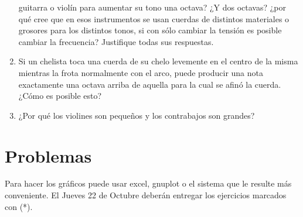 \documentclass[a4paper,12pt]{article}
\begin{document}
\begin{enumerate}
		guitarra o violín para aumentar su tono una octava? ¿Y dos octavas?
		¿por qué cree que en esos instrumentos se usan cuerdas de distintos
		materiales o grosores para los distintos tonos, si con sólo cambiar la
		tensión es posible cambiar la frecuencia? Justifique todas sus
		respuestas.
	\item Si un chelista toca una cuerda de su chelo levemente en el centro de
		la misma mientras la frota normalmente con el arco, puede producir una
		nota exactamente una octava arriba de aquella para la cual se afinó la
		cuerda. ¿Cómo es posible esto?
	\item ¿Por qué los violines son pequeños y los contrabajos son grandes?
\end{enumerate}

\section{Problemas}

Para hacer los gráficos puede usar excel, gnuplot o el sistema que le resulte
más conveniente. El Jueves 22 de Octubre deberán entregar los ejercicios
marcados con (*).
\end{document}
